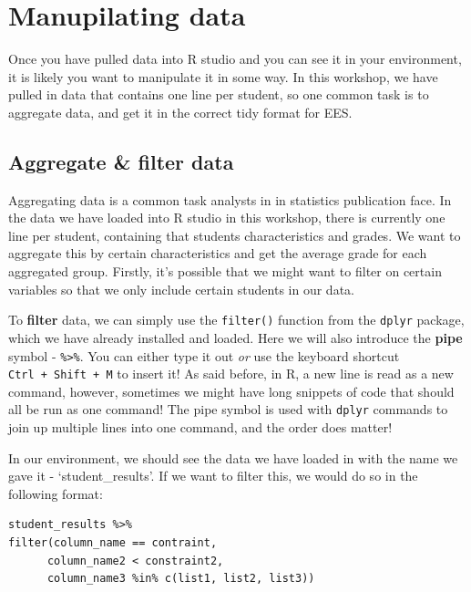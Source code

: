 \documentclass[
  12pt,
]{article}
\begin{document}
\hypertarget{manupilating-data}{%
\section{Manupilating data}\label{manupilating-data}}

Once you have pulled data into R studio and you can see it in your
environment, it is likely you want to manipulate it in some way. In this
workshop, we have pulled in data that contains one line per student, so
one common task is to aggregate data, and get it in the correct tidy
format for EES.

\hypertarget{aggregate-filter-data}{%
\subsection{Aggregate \& filter data}\label{aggregate-filter-data}}

Aggregating data is a common task analysts in in statistics publication
face. In the data we have loaded into R studio in this workshop, there
is currently one line per student, containing that students
characteristics and grades. We want to aggregate this by certain
characteristics and get the average grade for each aggregated group.
Firstly, it's possible that we might want to filter on certain variables
so that we only include certain students in our data.

To \textbf{filter} data, we can simply use the \texttt{filter()}
function from the \texttt{dplyr} package, which we have already
installed and loaded. Here we will also introduce the \textbf{pipe}
symbol - \texttt{\%\textgreater{}\%}. You can either type it out
\emph{or} use the keyboard shortcut \texttt{Ctrl\ +\ Shift\ +\ M} to
insert it! As said before, in R, a new line is read as a new command,
however, sometimes we might have long snippets of code that should all
be run as one command! The pipe symbol is used with \texttt{dplyr}
commands to join up multiple lines into one command, and the order does
matter!

In our environment, we should see the data we have loaded in with the
name we gave it - `student\_results'. If we want to filter this, we
would do so in the following format:

\begin{verbatim}
student_results %>%
filter(column_name == contraint, 
      column_name2 < constraint2, 
      column_name3 %in% c(list1, list2, list3))
\end{verbatim}
\end{document}
